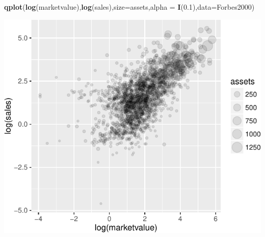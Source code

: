 \documentclass[]{article}
\newenvironment{Shaded}{\begin{snugshade}}{\end{snugshade}}
\newcommand{\KeywordTok}[1]{\textcolor[rgb]{0.13,0.29,0.53}{\textbf{{#1}}}}
\newcommand{\DataTypeTok}[1]{\textcolor[rgb]{0.13,0.29,0.53}{{#1}}}
\newcommand{\FloatTok}[1]{\textcolor[rgb]{0.00,0.00,0.81}{{#1}}}
\newcommand{\NormalTok}[1]{{#1}}
\numberwithin{equation}{section}
\begin{document}
\begin{Shaded}
\begin{Highlighting}[]
\KeywordTok{qplot}\NormalTok{(}\KeywordTok{log}\NormalTok{(marketvalue),}\KeywordTok{log}\NormalTok{(sales),}\DataTypeTok{size=}\NormalTok{assets,}\DataTypeTok{alpha =} \KeywordTok{I}\NormalTok{(}\FloatTok{0.1}\NormalTok{),}\DataTypeTok{data=}\NormalTok{Forbes2000)}
\end{Highlighting}
\end{Shaded}

\includegraphics{index_files/figure-latex/unnamed-chunk-254-4.pdf}
\end{document}
